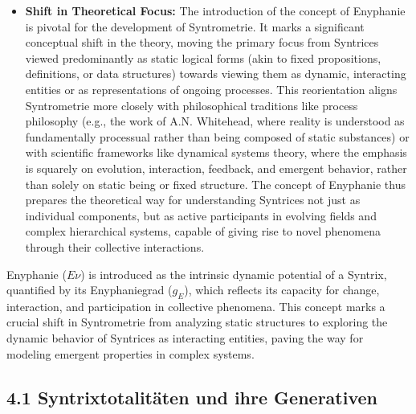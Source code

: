 \documentclass[12pt]{article}
\newcommand{\q}[1]{\enquote{#1}}
\newcommand{\enyphaniegrad}{g_E}
\begin{document}
\begin{itemize}
\begin{itemize}
    \end{itemize}
    A Syntrix with a higher Enyphaniegrad (\(\enyphaniegrad\)) would thus possess a greater propensity for undergoing internal change, for engaging in interactions with its environment or other Syntrices, or for contributing to the emergence of collective behaviors within an ensemble. Heim summarizes this by stating (paraphrased from SM p. 62): \q{Der Enyphaniegrad ist ein Maß für die Fähigkeit einer Syntrix, an kollektiven Phänomenen teilzunehmen.} (The Enyphaniegrad is a measure of the ability of a Syntrix to participate in collective phenomena.)
    \item \textbf{Shift in Theoretical Focus:} The introduction of the concept of Enyphanie is pivotal for the development of Syntrometrie. It marks a significant conceptual shift in the theory, moving the primary focus from Syntrices viewed predominantly as static logical forms (akin to fixed propositions, definitions, or data structures) towards viewing them as dynamic, interacting entities or as representations of ongoing processes. This reorientation aligns Syntrometrie more closely with philosophical traditions like process philosophy (e.g., the work of A.N. Whitehead, where reality is understood as fundamentally processual rather than being composed of static substances) or with scientific frameworks like dynamical systems theory, where the emphasis is squarely on evolution, interaction, feedback, and emergent behavior, rather than solely on static being or fixed structure. The concept of Enyphanie thus prepares the theoretical way for understanding Syntrices not just as individual components, but as active participants in evolving fields and complex hierarchical systems, capable of giving rise to novel phenomena through their collective interactions.
\end{itemize}

Enyphanie (\(E\nu\)) is introduced as the intrinsic dynamic potential of a Syntrix, quantified by its Enyphaniegrad (\(\enyphaniegrad\)), which reflects its capacity for change, interaction, and participation in collective phenomena. This concept marks a crucial shift in Syntrometrie from analyzing static structures to exploring the dynamic behavior of Syntrices as interacting entities, paving the way for modeling emergent properties in complex systems.

\subsection{4.1 Syntrixtotalitäten und ihre Generativen}
\label{sec:totalitaeten}
\end{document}

